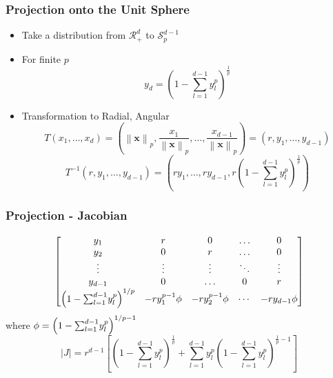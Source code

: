 \documentclass[aspectratio=169]{beamer}
\newcommand{\norm}[1]{\left\lVert #1 \right\rVert}
\newcommand{\pnorm}[2]{\norm{#1}_{#2}}
\begin{document}
\begin{frame}
  \frametitle{Projection onto the Unit Sphere}
  \begin{itemize}
    \item Take a distribution from $\mathcal{R}_+^{d}$ to $\mathcal{S}_{p}^{d-1}$
    \pause
    \item For finite $p$
      \begin{equation*}
        y_d = \left(1 - {\textstyle\sum}_{l = 1}^{d-1}y_l^p\right)^{\frac{1}{p}}
      \end{equation*}
    \pause
    \item Transformation to Radial, Angular
    \begin{equation*}
      T(x_1,\ldots,x_d) = \left(\pnorm{\bm{x}}{p}, \frac{x_1}{\pnorm{\bm{x}}{p}},
                    \ldots , \frac{x_{d-1}}{\pnorm{\bm{x}}{p}}\right) = (r,y_1,\ldots,y_{d-1})
    \end{equation*}
    \pause
    \begin{equation*}
    T^{-1}\left(r,y_1,\ldots,y_{d-1}\right) =
      \left(ry_1,\ldots,ry_{d-1}, r\left(1 - {\textstyle\sum}_{l = 1}^{d-1}y_l^p\right)^{\frac{1}{p}}\right)
    \end{equation*}
  \end{itemize}
\end{frame} %
\begin{frame}
  \frametitle{Projection - Jacobian}
  \begin{equation*}
    \begin{bmatrix}
      y_1 & r & 0 & \ldots & 0\\
      y_2 & 0 & r & \ldots & 0\\
      \vdots & \vdots & \vdots & \ddots & \vdots\\
      y_{d-1} & 0 & \ldots & 0 & r \\
      \left(1 - {\scriptsize\sum_{l=1}^{d-1}}y_l^p\right)^{1/p} &
        - ry_1^{p-1}\phi & -ry_2^{p-1}\phi & \cdots & -ry_{d-1}\phi
    \end{bmatrix}
  \end{equation*}
  where $\phi = \left(1 - {\scriptsize\sum_{l=1}^{d-1}}y_l^p\right)^{1/p - 1}$
  \pause
  \begin{equation*}
  \lvert J \rvert = r^{d-1}\left[\left(1 - {\textstyle\sum}_{l = 1}^{d-1}y_l^p\right)^{\frac{1}{p}} +
      {\textstyle\sum}_{l = 1}^{d-1}y_l^p\left(1 - {\textstyle\sum}_{l=1}^{d-1}
          y_l^p\right)^{\frac{1}{p} - 1}\right]
  \end{equation*}
\end{frame} %
\end{document}
